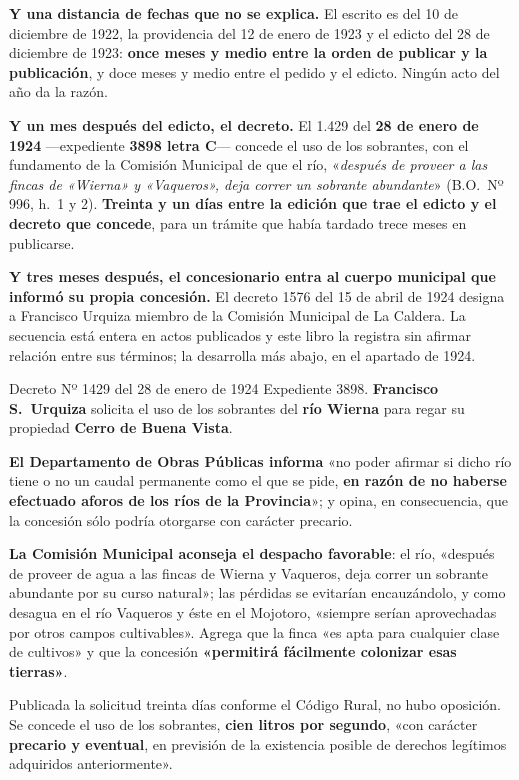 \begin{cautela}
\textbf{Y una distancia de fechas que no se explica.} El escrito es del 10 de diciembre de 1922,
la providencia del 12 de enero de 1923 y el edicto del 28 de diciembre de 1923: \textbf{once
meses y medio entre la orden de publicar y la publicación}, y doce meses y medio entre el
pedido y el edicto. Ningún acto del año da la razón.

\textbf{Y un mes después del edicto, el decreto.} El 1.429 del \textbf{28 de enero de 1924}
---expediente \textbf{3898 letra C}--- concede el uso de los sobrantes, con el fundamento de la
Comisión Municipal de que el río, «\textit{después de proveer a las fincas de
«Wierna» y «Vaqueros», deja correr un sobrante abundante}» (B.O.\ Nº 996, h.\ 1 y 2).
\textbf{Treinta y un días entre la edición que trae el edicto y el decreto que concede}, para un
trámite que había tardado trece meses en publicarse.

\textbf{Y tres meses después, el concesionario entra al cuerpo municipal que informó su propia
concesión.} El decreto 1576 del 15 de abril de 1924 designa a Francisco Urquiza
miembro de la Comisión Municipal de La Caldera. La secuencia está entera en actos publicados y
este libro la registra sin afirmar relación entre sus términos; la desarrolla más abajo, en el
apartado de 1924.
\end{cautela}

\begin{ficha}{Decreto Nº 1429 del 28 de enero de 1924}
Expediente 3898. \textbf{Francisco S.\ Urquiza} solicita el uso de los sobrantes del
\textbf{río Wierna} para regar su propiedad \textbf{Cerro de Buena Vista}.

\textbf{El Departamento de Obras Públicas informa} «no poder afirmar si dicho río tiene o
no un caudal permanente como el que se pide, \textbf{en razón de no haberse efectuado
aforos de los ríos de la Provincia}»; y opina, en consecuencia, que la concesión sólo
podría otorgarse con carácter precario.

\textbf{La Comisión Municipal aconseja el despacho favorable}: el río, «después de proveer
de agua a las fincas de Wierna y Vaqueros, deja correr un sobrante abundante por su curso
natural»; las pérdidas se evitarían encauzándolo, y como desagua en el río Vaqueros y éste
en el Mojotoro, «siempre serían aprovechadas por otros campos cultivables». Agrega que la
finca «es apta para cualquier clase de cultivos» y que la concesión \textbf{«permitirá
fácilmente colonizar esas tierras»}.

Publicada la solicitud treinta días conforme el Código Rural, no hubo oposición. Se concede
el uso de los sobrantes, \textbf{cien litros por segundo}, «con carácter \textbf{precario y
eventual}, en previsión de la existencia posible de derechos legítimos adquiridos
anteriormente».
\end{ficha}


